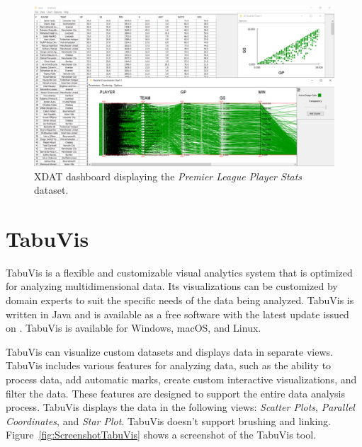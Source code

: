 \begin{figure}[tp]
\centering
\includegraphics[keepaspectratio,width=\linewidth,height=\halfh]
{images/screenshot-xdat.png}

\caption[XDAT Dashboard Screenshot]
{%
XDAT dashboard displaying the \emph{Premier League Player Stats} dataset.
}
\label{fig:ScreenshotXDAT}
\end{figure}



\section{TabuVis}

TabuVis \parencite{nguyen2013tabuvis} is a flexible and customizable
visual analytics system that is optimized for analyzing
multidimensional data. Its visualizations can be customized by domain
experts to suit the specific needs of the data being analyzed. TabuVis
is written in Java and is available as a free software with the latest
update issued on . TabuVis is available for 
Windows, macOS, and Linux.

TabuVis can visualize custom datasets and displays data in separate views.
TabuVis includes various features for analyzing data, such as the ability to
process data, add automatic marks, create custom interactive visualizations, and
filter the data. These features are designed to support the entire data analysis
process. TabuVis displays the data in the following views: \emph{Scatter Plots},
\emph{Parallel Coordinates}, and \emph{Star Plot}. TabuVis doesn't support
brushing and linking. Figure~\ref{fig:ScreenshotTabuVis} shows a screenshot of the
TabuVis tool.




